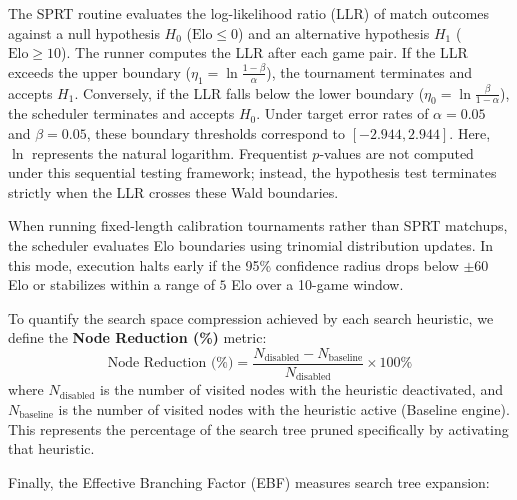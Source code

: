 The SPRT routine evaluates the log-likelihood ratio (LLR) of match outcomes against a null hypothesis $H_0$ ($\text{Elo} \le 0$) and an alternative hypothesis $H_1$ ($\text{Elo} \ge 10$). The runner computes the LLR after each game pair. If the LLR exceeds the upper boundary ($\eta_1 = \ln \frac{1-\beta}{\alpha}$), the tournament terminates and accepts $H_1$. Conversely, if the LLR falls below the lower boundary ($\eta_0 = \ln \frac{\beta}{1-\alpha}$), the scheduler terminates and accepts $H_0$. Under target error rates of $\alpha = 0.05$ and $\beta = 0.05$, these boundary thresholds correspond to $[-2.944, 2.944]$. Here, $\ln$ represents the natural logarithm. Frequentist $p$-values are not computed under this sequential testing framework; instead, the hypothesis test terminates strictly when the LLR crosses these Wald boundaries.


When running fixed-length calibration tournaments rather than SPRT matchups, the scheduler evaluates Elo boundaries using trinomial distribution updates. In this mode, execution halts early if the 95\% confidence radius drops below $\pm 60$ Elo or stabilizes within a range of $5$ Elo over a 10-game window.


To quantify the search space compression achieved by each search heuristic, we define the \textbf{Node Reduction (\%)} metric:
\begin{equation}
    \text{Node Reduction (\%)} = \frac{N_{\text{disabled}} - N_{\text{baseline}}}{N_{\text{disabled}}} \times 100\%
\end{equation}
where $N_{\text{disabled}}$ is the number of visited nodes with the heuristic deactivated, and $N_{\text{baseline}}$ is the number of visited nodes with the heuristic active (Baseline engine). This represents the percentage of the search tree pruned specifically by activating that heuristic.

Finally, the Effective Branching Factor (EBF) measures search tree expansion:




